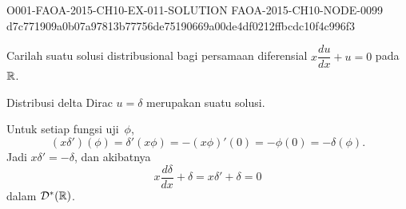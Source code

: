 \begin{o001solution}
  {O001-FAOA-2015-CH10-EX-011-SOLUTION}
  {FAOA-2015-CH10-NODE-0099}
  {d7c771909a0b07a97813b77756de75190669a00de4df0212ffbcdc10f4c996f3}
\begin{o001statement}
Carilah suatu solusi distribusional bagi persamaan diferensial $x \dfrac{du}{dx} + u = 0$ pada~$\mathbb{R}$.
\end{o001statement}
\begin{o001answer}
Distribusi delta Dirac $u=\delta$ merupakan suatu solusi.
\end{o001answer}
\begin{o001proof}
Untuk setiap fungsi uji~$\phi$,
\[
 (x\delta')(\phi)=\delta'(x\phi)
 =-(x\phi)'(0)=-\phi(0)=-\delta(\phi).
\]
Jadi $x\delta'=-\delta$, dan akibatnya
\[
 x\frac{d\delta}{dx}+\delta=x\delta'+\delta=0
\]
dalam $\mathcal{D}^*(\mathbb{R})$.
\end{o001proof}
\end{o001solution}
